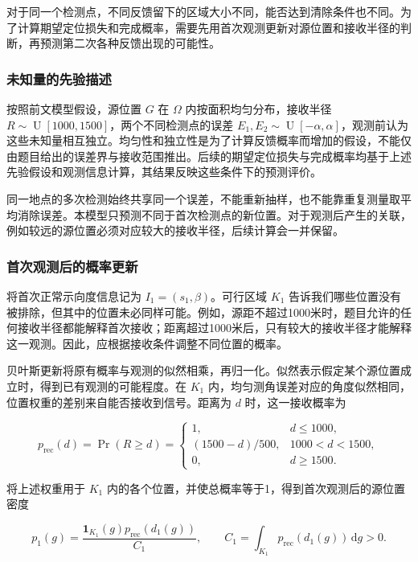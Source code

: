 对于同一个检测点，不同反馈留下的区域大小不同，能否达到清除条件也不同。为了计算期望定位损失和完成概率，需要先用首次观测更新对源位置和接收半径的判断，再预测第二次各种反馈出现的可能性。

\subsubsection{未知量的先验描述}

按照前文模型假设，源位置 \(G\) 在 \(\Omega\) 内按面积均匀分布，接收半径 \(R\sim\operatorname{U}[1000,1500]\)，两个不同检测点的误差 \(E_1,E_2\sim\operatorname{U}[-\alpha,\alpha]\)，观测前认为这些未知量相互独立。均匀性和独立性是为了计算反馈概率而增加的假设，不能仅由题目给出的误差界与接收范围推出。后续的期望定位损失与完成概率均基于上述先验假设和观测信息计算，其结果反映这些条件下的预测评价。

同一地点的多次检测始终共享同一个误差，不能重新抽样，也不能靠重复测量取平均消除误差。本模型只预测不同于首次检测点的新位置。对于观测后产生的关联，例如较远的源位置必须对应较大的接收半径，后续计算会一并保留。

\subsubsection{首次观测后的概率更新}

将首次正常示向度信息记为 \(I_1=(s_1,\beta)\)。可行区域 \(K_1\) 告诉我们哪些位置没有被排除，但其中的位置未必同样可能。例如，源距不超过1000米时，题目允许的任何接收半径都能解释首次接收；距离超过1000米后，只有较大的接收半径才能解释这一观测。因此，应根据接收条件调整不同位置的概率。

贝叶斯更新将原有概率与观测的似然相乘，再归一化。似然表示假定某个源位置成立时，得到已有观测的可能程度。在 \(K_1\) 内，均匀测角误差对应的角度似然相同，位置权重的差别来自能否接收到信号。距离为 \(d\) 时，这一接收概率为

\begin{equation}
 p_{\mathrm{rec}}(d)=\Pr(R\ge d)=
 \begin{cases}
 1,&d\le1000,\\
 (1500-d)/500,&1000<d<1500,\\
 0,&d\ge1500.
 \end{cases}
\label{eq:q2-pair-weight}
\end{equation}

将上述权重用于 \(K_1\) 内的各个位置，并使总概率等于1，得到首次观测后的源位置密度

\begin{equation}
 p_1(g)=\frac{\mathbf1_{K_1}(g)p_{\mathrm{rec}}(d_1(g))}{C_1},
 \qquad C_1=\int_{K_1}p_{\mathrm{rec}}(d_1(g))\,\mathrm dg>0.
\label{eq:q2-pair-posterior}
\end{equation}

